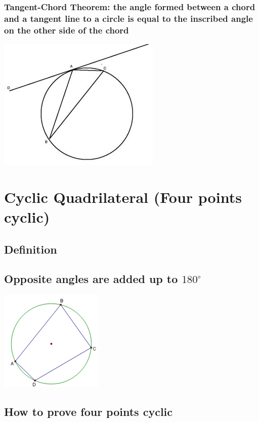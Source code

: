 \documentclass{article}
\begin{document}
\subsubsection{Tangent-Chord Theorem: the angle formed between a chord and a tangent line to a circle is equal to the inscribed angle on the other side of the chord}

\includegraphics{Picture8.jpg}

\pagebreak

\section{Cyclic Quadrilateral (Four points cyclic)}

\subsection{Definition}

\vspace{20px}

\subsection{Opposite angles are added up to \(180^{\circ}\)}

\includegraphics[scale=.8]{Picture9.png}

\subsection{How to prove four points cyclic}
\end{document}
